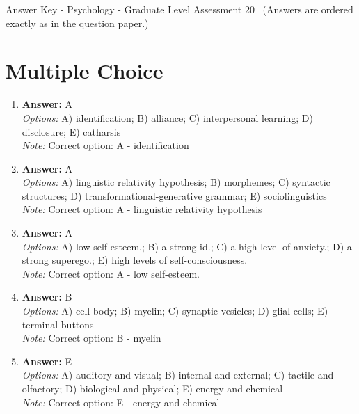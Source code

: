\documentclass[12pt]{article}
\begin{document}
\begin{center}
Answer Key - Psychology - Graduate Level Assessment 20 \
\small (Answers are ordered exactly as in the question paper.)
\end{center}

\section*{Multiple Choice}
\begin{enumerate}[label=\arabic*.]
\item \textbf{Answer:} A
\\ \textit{Options:} A) identification; B) alliance; C) interpersonal learning; D) disclosure; E) catharsis
\\ \textit{Note:} Correct option: A - identification
\item \textbf{Answer:} A
\\ \textit{Options:} A) linguistic relativity hypothesis; B) morphemes; C) syntactic structures; D) transformational-generative grammar; E) sociolinguistics
\\ \textit{Note:} Correct option: A - linguistic relativity hypothesis
\item \textbf{Answer:} A
\\ \textit{Options:} A) low self-esteem.; B) a strong id.; C) a high level of anxiety.; D) a strong superego.; E) high levels of self-consciousness.
\\ \textit{Note:} Correct option: A - low self-esteem.
\item \textbf{Answer:} B
\\ \textit{Options:} A) cell body; B) myelin; C) synaptic vesicles; D) glial cells; E) terminal buttons
\\ \textit{Note:} Correct option: B - myelin
\item \textbf{Answer:} E
\\ \textit{Options:} A) auditory and visual; B) internal and external; C) tactile and olfactory; D) biological and physical; E) energy and chemical
\\ \textit{Note:} Correct option: E - energy and chemical
\end{enumerate}
\end{document}
